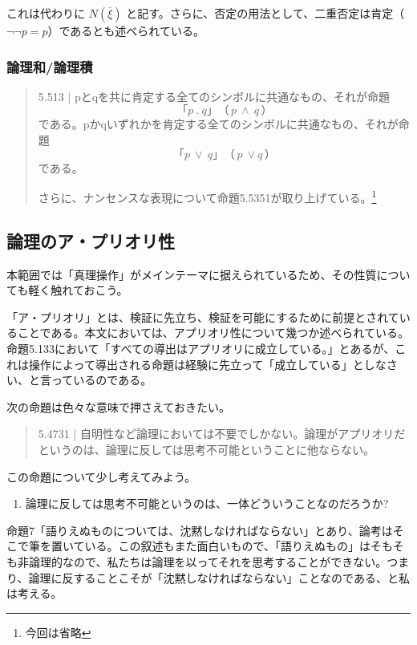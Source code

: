 \documentclass[11pt,a4paper,onecolumn,article]{jarticle}
\newcounter{ct}               %
\begin{document}
これは代わりに
$ N( \overline{ \xi } ) $
と記す。さらに、否定の用法として、二重否定は肯定（$\lnot \lnot p = p$）であるとも述べられている。
\subsubsection{論理和/論理積}
\begin{quote}
  5.513 | pとqを共に肯定する全てのシンボルに共通なもの、それが命題
  \[
    「 p \ . \ q  」（ \, p \ \land \ q\, ）
  \]
    である。pかqいずれかを肯定する全てのシンボルに共通なもの、それが命題
  \[
    「 p \ \vee \ q 」（\,p \ \lor q \,）
  \]
    である。
    
  さらに、ナンセンスな表現について命題5.5351が取り上げている。\footnote{今回は省略}
\end{quote}


\subsection{論理のア・プリオリ性}

本範囲では「真理操作」がメインテーマに据えられているため、その性質についても軽く触れておこう。

「ア・プリオリ」とは、検証に先立ち、検証を可能にするために前提とされていることである。本文においては、アプリオリ性について幾つか述べられている。命題5.133において「すべての導出はアプリオリに成立している。」とあるが、これは操作によって導出される命題は経験に先立って「成立している」としなさい、と言っているのである。

次の命題は色々な意味で押さえておきたい。
\begin{quote}
  
  5.4731 | 自明性など論理においては不要でしかない。論理がアプリオリだというのは、論理に反しては思考不可能ということに他ならない。
  
\end{quote}

この命題について少し考えてみよう。
\begin{enumerate}
  \item 論理に反しては思考不可能というのは、一体どういうことなのだろうか?
\end{enumerate}

命題7「語りえぬものについては、沈黙しなければならない」とあり、論考はそこで筆を置いている。この叙述もまた面白いもので、「語りえぬもの」はそもそも非論理的なので、私たちは論理を以ってそれを思考することができない。つまり、論理に反することこそが「沈黙しなければならない」ことなのである、と私は考える。
\end{document}
